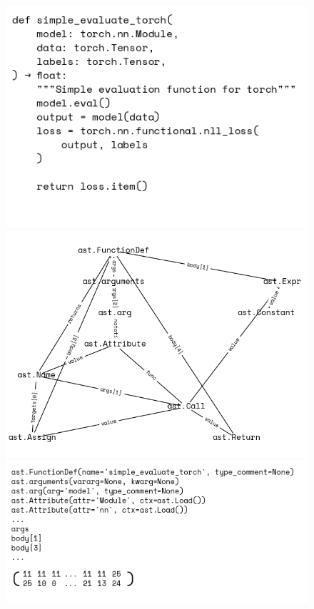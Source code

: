 \documentclass[sigplan,screen,anonymous,natbib=false]{acmart}
\begin{document}
\begin{figure}[!ht]
    \centering
    \begin{minipage}[l]{0.3\textwidth}
        \centering
        \includegraphics[width=\linewidth]{assets/source.tiff}
    \end{minipage}
    \hspace*{\fill}
    \begin{minipage}[l]{0.3\textwidth}
        \centering
        \includegraphics[width=\linewidth]{assets/graph.tiff}
    \end{minipage}
    \hspace*{\fill}
    \begin{minipage}[l]{0.35\textwidth}
        \centering
        \includegraphics[width=\linewidth]{assets/tokens.tiff}

\end{minipage}
\end{figure}
\end{document}
